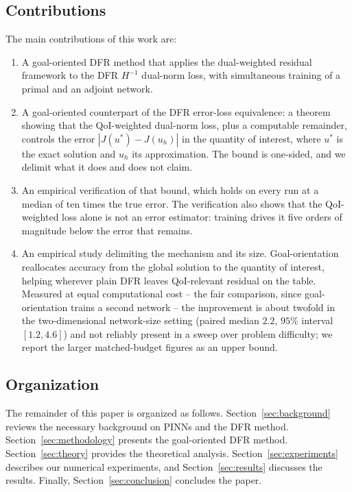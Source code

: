 \documentclass[preprint,11pt]{elsarticle}
\begin{document}
\subsection{Contributions}

The main contributions of this work are:
\begin{enumerate}
    \item A goal-oriented DFR method that applies the dual-weighted residual framework to the DFR $H^{-1}$ dual-norm loss, with simultaneous training of a primal and an adjoint network.
    \item A goal-oriented counterpart of the DFR error-loss equivalence: a theorem showing that the QoI-weighted dual-norm loss, plus a computable remainder, controls the error $|J(u^*) - J(u_h)|$ in the quantity of interest, where $u^*$ is the exact solution and $u_h$ its approximation. The bound is one-sided, and we delimit what it does and does not claim.
    \item An empirical verification of that bound, which holds on every run at a median of ten times the true error. The verification also shows that the QoI-weighted loss alone is not an error estimator: training drives it five orders of magnitude below the error that remains.
    \item An empirical study delimiting the mechanism and its size. Goal-orientation reallocates accuracy from the global solution to the quantity of interest, helping wherever plain DFR leaves QoI-relevant residual on the table. Measured at equal computational cost -- the fair comparison, since goal-orientation trains a second network -- the improvement is about twofold in the two-dimensional network-size setting (paired median $2.2$, $95\%$ interval $[1.2, 4.6]$) and not reliably present in a sweep over problem difficulty; we report the larger matched-budget figures as an upper bound.
\end{enumerate}

\subsection{Organization}

The remainder of this paper is organized as follows. Section~\ref{sec:background} reviews the necessary background on PINNs and the DFR method. Section~\ref{sec:methodology} presents the goal-oriented DFR method. Section~\ref{sec:theory} provides the theoretical analysis. Section~\ref{sec:experiments} describes our numerical experiments, and Section~\ref{sec:results} discusses the results. Finally, Section~\ref{sec:conclusion} concludes the paper.
\end{document}
